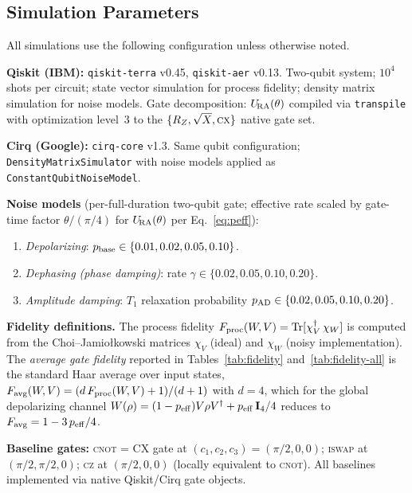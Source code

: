 \subsection{Simulation Parameters}
\label{app:sim-params}

All simulations use the following configuration unless otherwise noted.

\textbf{Qiskit (IBM):} \texttt{qiskit-terra} v0.45, \texttt{qiskit-aer} v0.13.
Two-qubit system; $10^4$ shots per circuit; state vector simulation for
process fidelity; density matrix simulation for noise models.
Gate decomposition: $U_{\!\mathrm{RA}}(\theta)$ compiled via \texttt{transpile} with
optimization level~3 to the $\{R_Z, \sqrt{X}, \textsc{cx}\}$ native gate set.

\textbf{Cirq (Google):} \texttt{cirq-core} v1.3.
Same qubit configuration; \texttt{DensityMatrixSimulator} with noise models
applied as \texttt{ConstantQubitNoiseModel}.

\textbf{Noise models}
(per-full-duration two-qubit gate; effective rate scaled by gate-time
factor $\theta/(\pi/4)$ for $U_{\!\mathrm{RA}}(\theta)$ per Eq.~\eqref{eq:peff}):
\begin{enumerate}
  \item \emph{Depolarizing}: $p_{\rm base} \in \{0.01, 0.02, 0.05, 0.10\}$.
  \item \emph{Dephasing (phase damping)}: rate $\gamma \in \{0.02, 0.05, 0.10, 0.20\}$.
  \item \emph{Amplitude damping}: $T_1$ relaxation probability
        $p_{\rm AD} \in \{0.02, 0.05, 0.10, 0.20\}$.
\end{enumerate}

\textbf{Fidelity definitions.}
The process fidelity $F_{\rm proc}(W,V) = \mathrm{Tr}[\chi_V^\dagger\,\chi_W]$
is computed from the Choi--Jamio\l{}kowski matrices $\chi_V$
(ideal) and $\chi_W$ (noisy implementation).
The \emph{average gate fidelity} reported in Tables~\ref{tab:fidelity}
and~\ref{tab:fidelity-all} is the standard Haar average over input
states,
$F_{\rm avg}(W,V) = (d\,F_{\rm proc}(W,V) + 1)/(d+1)$ with $d = 4$,
which for the global depolarizing channel
$W(\rho) = (1-p_{\rm eff})V\rho V^\dagger + p_{\rm eff}\,\mathbf{I}_4/4$
reduces to $F_{\rm avg} = 1 - 3\,p_{\rm eff}/4$.

\textbf{Baseline gates:} \textsc{cnot} = $\mathrm{CX}$ gate at $(c_1,c_2,c_3) = (\pi/2,0,0)$;
\textsc{iswap} at $(\pi/2,\pi/2,0)$; \textsc{cz} at $(\pi/2,0,0)$ (locally
equivalent to \textsc{cnot}).
All baselines implemented via native Qiskit/Cirq gate objects.
